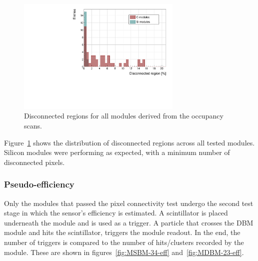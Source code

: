 \begin{figure}[!t]
\centering
\includegraphics[width=0.7\textwidth]{../scripts/04_charge_monitoring/plots/disconnectedregion1} \caption{Disconnected regions for all modules derived from the occupancy scans.}
\label{fig:disconreg}
\end{figure}

Figure~\ref{fig:disconreg} shows the distribution of disconnected regions across all tested modules. Silicon modules were performing as expected, with a minimum number of disconnected pixels.




\subsubsection{Pseudo-efficiency}
Only the modules that passed the pixel connectivity test undergo the second test stage in which the sensor's efficiency is estimated. A scintillator is placed underneath the module and is used as a trigger. A particle that crosses the DBM module and hits the scintillator, triggers the module readout. In the end, the number of triggers is compared to the number of hits/clusters recorded by the module. These are shown in figures~\ref{fig:MSBM-34-eff} and~\ref{fig:MDBM-23-eff}. 

